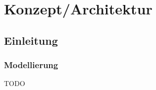 
\chapter{Konzept/Architektur} \label{chapter:architecture}


\section{Einleitung}
\subsection{Modellierung}


TODO